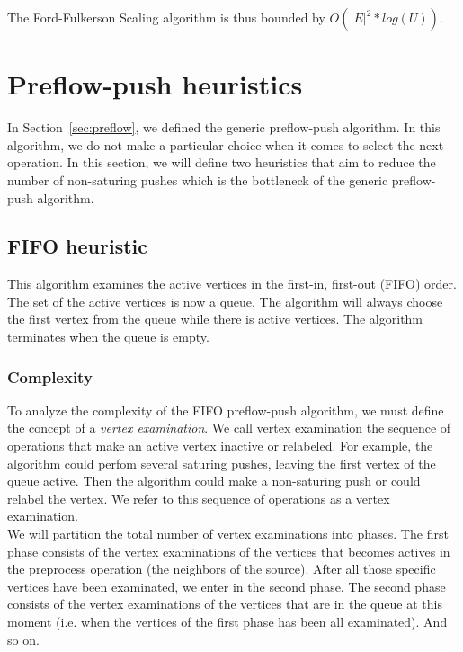 The Ford-Fulkerson Scaling algorithm is thus bounded by $O(|E|^2* log(U))$.

\section{Preflow-push heuristics}

In Section~\ref{sec:preflow}, we defined the generic preflow-push algorithm. In this algorithm, we do not make a particular choice when it comes to select the next operation. In this section, we will define two heuristics that aim to reduce the number of non-saturing pushes which is the bottleneck of the generic preflow-push algorithm.

\subsection{FIFO heuristic}

This algorithm examines the active vertices in the first-in, first-out (FIFO) order. The set of the active vertices is now a queue. The algorithm will always choose the first vertex from the queue while there is active vertices. The algorithm terminates when the queue is empty. 

\subsubsection{Complexity}

To analyze the complexity of the FIFO preflow-push algorithm, we must define the concept of a \textit{vertex examination}. We call vertex examination the sequence of operations that make an active vertex inactive or relabeled. For example, the algorithm could perfom several saturing pushes, leaving the first vertex of the queue active. Then the algorithm could make a non-saturing push or could relabel the vertex. We refer to this sequence of operations as a vertex examination.\\

We will partition the total number of vertex examinations into phases. The first phase consists of the vertex examinations of the vertices that becomes actives in the preprocess operation (the neighbors of the source). After all those specific vertices have been examinated, we enter in the second phase. The second phase consists of the vertex examinations of the vertices that are in the queue at this moment (i.e. when the vertices of the first phase has been all examinated). And so on.\\


